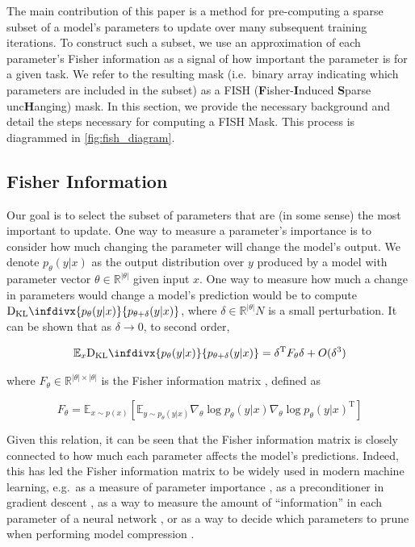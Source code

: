 The main contribution of this paper is a method for pre-computing a sparse subset of a model's parameters to update over many subsequent training iterations. To construct such a subset, we use an approximation of each parameter's Fisher information as a signal of how important the parameter is for a given task. We refer to the resulting mask (i.e.\ binary array indicating which parameters are included in the subset) as a FISH (\textbf{F}isher-\textbf{I}nduced \textbf{S}parse unc\textbf{H}anging) mask. In this section, we provide the necessary background and detail the steps necessary for computing a FISH Mask. This process is diagrammed in \ref{fig:fish_diagram}.

\subsection{Fisher Information}

Our goal is to select the subset of parameters that are (in some sense) the most important to update. One way to measure a parameter's importance is to consider how much changing the parameter will change the model's output. We denote $p_\theta(y | x)$ as the output distribution over $y$ produced by a model with parameter vector $\theta \in \mathbb{R}^{|\theta|}$ given input $x$. One way to measure how much a change in parameters would change a model's prediction would be to compute $\mathrm{D_{KL}}\infdivx{p_\theta(y | x)}{p_{\theta + \delta}(y | x)}$, where $\delta \in \mathbb{R}^{|\theta|}N$ is a small perturbation. It can be shown \citep{martens2014new,pascanu2013revisiting} that as $\delta \rightarrow 0$, to second order,

\begin{equation}
    \mathbb{E}_x \mathrm{D_{KL}}\infdivx{p_\theta(y | x)}{p_{\theta + \delta}(y | x)} = \delta^{\mathrm{T}} F_\theta \delta + O(\delta^3)
\end{equation}

where $F_\theta \in \mathbb{R}^{{|\theta|} \times {|\theta|}}$ is the Fisher information matrix \citep{fisher1922mathematical,amari1997neural}, defined as

\begin{equation}
    F_{\theta} = \mathbb{E}_{x \sim p(x)}\left[ \mathbb{E}_{y \sim p_{\theta}(y|x)}{\nabla_{\theta} \log p_{\theta}(y|x) \nabla_{\theta} \log p_{\theta}(y|x)^{\mathrm{T}}} \right]
    \label{eqn:full_fisher}
\end{equation}

Given this relation, it can be seen that the Fisher information matrix is closely connected to how much each parameter affects the model's predictions. Indeed, this has led the Fisher information matrix to be widely used in modern machine learning, e.g.\ as a measure of parameter importance \cite{kirkpatrick2017overcoming}, as a preconditioner in gradient descent \cite{amari1997neural,pascanu2013revisiting,martens2014new}, as a way to measure the amount of ``information'' in each parameter of a neural network \cite{achille2019information}, or as a way to decide which parameters to prune when performing model compression \cite{singh2020woodfisher,crowley2018pruning,theis2018faster}.

